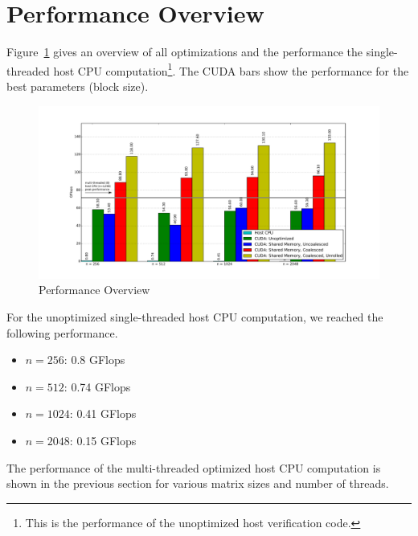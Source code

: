 \documentclass[12pt]{article}
\begin{document}
\section{Performance Overview}
Figure~\ref{fig:overview} gives an overview of all optimizations and the performance the single-threaded host CPU computation\footnote{This is the performance of the unoptimized host verification code.}. The CUDA bars show the performance for the best parameters (block size).

\begin{figure}[H]
\includegraphics[width=\textwidth]{overview.pdf}
\caption{Performance Overview}
\label{fig:overview}
\end{figure}

For the unoptimized single-threaded host CPU computation, we reached the following performance.
\begin{itemize}
    \item $n=256$: 0.8 GFlops
    \item $n=512$: 0.74 GFlops
    \item $n=1024$: 0.41 GFlops
    \item $n=2048$: 0.15 GFlops
\end{itemize}

The performance of the multi-threaded optimized host CPU computation is shown in the previous section for various matrix sizes and number of threads.
\end{document}
